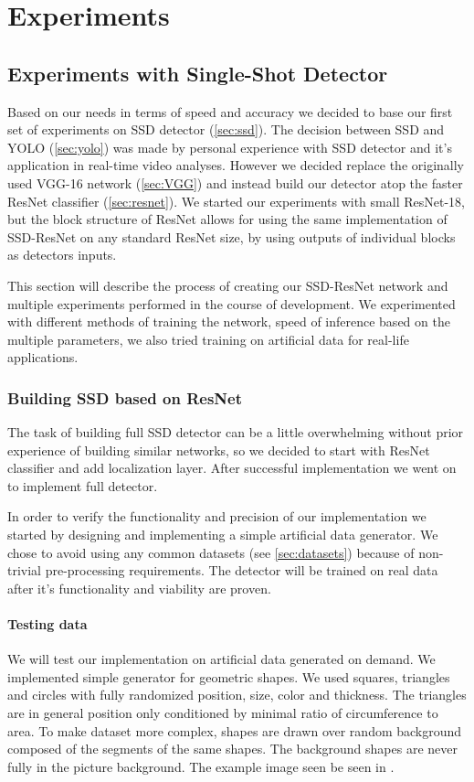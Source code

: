 \chapter{Experiments}
\section{Experiments with Single-Shot Detector}
\label{chapt:experiments}
Based on our needs in terms of speed and accuracy we decided to base our first set of experiments on SSD detector (\cref{sec:ssd}). The decision between SSD and YOLO (\cref{sec:yolo}) was made by personal experience with SSD detector and it's application in real-time video analyses. However we decided replace the originally used VGG-16 network (\cref{sec:VGG}) and instead build our detector atop the faster ResNet classifier (\cref{sec:resnet}). We started our experiments with small ResNet-18, but the block structure of ResNet allows for using the same implementation of SSD-ResNet on any standard ResNet size, by using outputs of individual blocks as detectors inputs.

This section will describe the process of creating our SSD-ResNet network and multiple experiments performed in the course of development. We experimented with different methods of training the network, speed of inference based on the multiple parameters, we also tried training on artificial data for real-life applications.


\subsection{Building SSD based on ResNet}
The task of building full SSD detector can be a little overwhelming without prior experience of building similar networks, so we decided to start with ResNet classifier and add localization layer. After successful implementation we went on to implement full detector. 

In order to verify the functionality and precision of our implementation we started by designing and implementing a simple artificial data generator. We chose to avoid using any common datasets (see \cref{sec:datasets}) because of non-trivial pre-processing requirements. The detector will be trained on real data after it's functionality and viability are proven.

\subsubsection{Testing data}
We will test our implementation on artificial data generated on demand. We implemented simple generator for geometric shapes. We used squares, triangles and circles with fully randomized position, size, color and thickness. The triangles are in general position only conditioned by minimal ratio of circumference to area.
To make dataset more complex, shapes are drawn over random background composed of the segments of the same shapes. The background shapes are never fully in the picture background. The example image seen be seen in .



